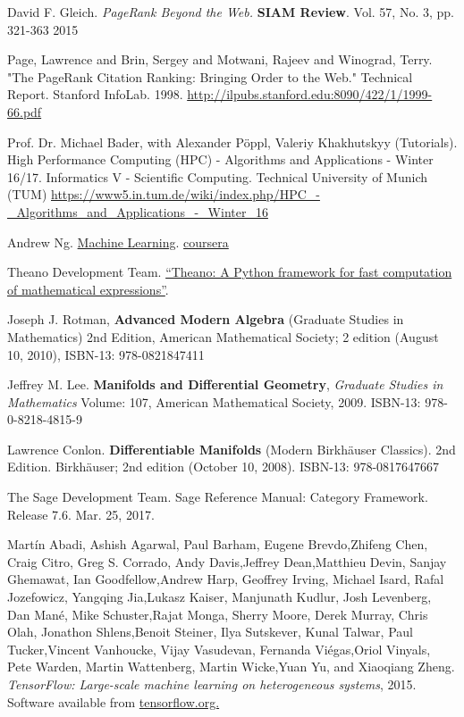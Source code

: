 \documentclass[10pt]{amsart}
\begin{document}
\begin{thebibliography}{9}
David F. Gleich.  \emph{PageRank Beyond the Web.}  \textbf{SIAM Review}.  Vol. 57, No. 3, pp. 321-363 2015  
  
Page, Lawrence and Brin, Sergey and Motwani, Rajeev and Winograd, Terry.  "The PageRank Citation Ranking: Bringing Order to the Web." Technical Report. Stanford InfoLab.  1998.  \url{http://ilpubs.stanford.edu:8090/422/1/1999-66.pdf}  
  
Prof. Dr. Michael Bader, with Alexander P\"{o}ppl, Valeriy Khakhutskyy (Tutorials).  High Performance Computing (HPC) - Algorithms and Applications - Winter 16/17.  Informatics V - Scientific Computing.  Technical University of Munich (TUM)
\url{https://www5.in.tum.de/wiki/index.php/HPC_-_Algorithms_and_Applications_-_Winter_16}


Andrew Ng.  \href{https://www.coursera.org/learn/machine-learning/home/welcome}{Machine Learning}.  \href{https://www.coursera.org}{coursera}

Theano Development Team. \href{http://arxiv.org/pdf/1605.02688.pdf}{“Theano: A Python framework for fast computation of mathematical expressions”}. 

Joseph J. Rotman, \textbf{Advanced Modern Algebra} (Graduate Studies in Mathematics) 2nd Edition, American Mathematical Society; 2 edition (August 10, 2010), ISBN-13: 978-0821847411

Jeffrey M. Lee. \textbf{Manifolds and Differential Geometry}, \emph{Graduate Studies in Mathematics} Volume: 107, American Mathematical Society, 2009. ISBN-13: 978-0-8218-4815-9

Lawrence Conlon.  \textbf{Differentiable Manifolds} (Modern Birkhäuser Classics).  2nd Edition.  Birkhäuser; 2nd edition (October 10, 2008).  ISBN-13: 978-0817647667

The Sage Development Team.  Sage Reference Manual: Category Framework.  Release 7.6.  Mar. 25, 2017.  

Martín Abadi, Ashish Agarwal, Paul Barham, Eugene Brevdo,Zhifeng Chen, Craig Citro, Greg S. Corrado, Andy Davis,Jeffrey Dean,Matthieu Devin, Sanjay Ghemawat, Ian Goodfellow,Andrew Harp, Geoffrey Irving, Michael Isard, Rafal Jozefowicz, Yangqing Jia,Lukasz Kaiser, Manjunath Kudlur, Josh Levenberg, Dan Mané, Mike Schuster,Rajat Monga, Sherry Moore, Derek Murray, Chris Olah, Jonathon Shlens,Benoit Steiner, Ilya Sutskever, Kunal Talwar, Paul Tucker,Vincent Vanhoucke, Vijay Vasudevan, Fernanda Viégas,Oriol Vinyals, Pete Warden, Martin Wattenberg, Martin Wicke,Yuan Yu, and Xiaoqiang Zheng.  
\emph{TensorFlow: Large-scale machine learning on heterogeneous systems}, 2015. Software available from \href{http://tensorflow.org/}{tensorflow.org.}


\end{thebibliography}
\end{document}
